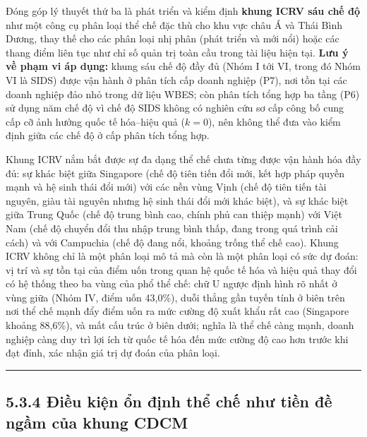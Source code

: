 \documentclass[
  a4paper,
  13pt]{extreport}
\begin{document}
Đóng góp lý thuyết thứ ba là phát triển và kiểm định \textbf{khung ICRV
sáu chế độ} như một công cụ phân loại thể chế đặc thù cho khu vực châu Á
và Thái Bình Dương, thay thế cho các phân loại nhị phân (phát triển và
mới nổi) hoặc các thang điểm liên tục như chỉ số quản trị toàn cầu trong
tài liệu hiện tại. \textbf{Lưu ý về phạm vi áp dụng:} khung sáu chế độ
đầy đủ (Nhóm I tới VI, trong đó Nhóm VI là SIDS) được vận hành ở phân
tích cấp doanh nghiệp (P7), nơi tồn tại các doanh nghiệp đảo nhỏ trong
dữ liệu WBES; còn phân tích tổng hợp ba tầng (P6) sử dụng năm chế độ vì
chế độ SIDS không có nghiên cứu sơ cấp công bố cung cấp cỡ ảnh hưởng
quốc tế hóa--hiệu quả (\(k = 0\)), nên không thể đưa vào kiểm định giữa
các chế độ ở cấp phân tích tổng hợp.

Khung ICRV nắm bắt được sự đa dạng thể chế chưa từng được vận hành hóa
đầy đủ: sự khác biệt giữa Singapore (chế độ tiên tiến đổi mới, kết hợp
pháp quyền mạnh và hệ sinh thái đổi mới) với các nền vùng Vịnh (chế độ
tiên tiến tài nguyên, giàu tài nguyên nhưng hệ sinh thái đổi mới khác
biệt), và sự khác biệt giữa Trung Quốc (chế độ trung bình cao, chính phủ
can thiệp mạnh) với Việt Nam (chế độ chuyển đổi thu nhập trung bình
thấp, đang trong quá trình cải cách) và với Campuchia (chế độ đang nổi,
khoảng trống thể chế cao). Khung ICRV không chỉ là một phân loại mô tả
mà còn là một phân loại có sức dự đoán: vị trí và sự tồn tại của điểm
uốn trong quan hệ quốc tế hóa và hiệu quả thay đổi có hệ thống theo ba
vùng của phổ thể chế: chữ U ngược định hình rõ nhất ở vùng giữa (Nhóm
IV, điểm uốn 43,0\%), duỗi thẳng gần tuyến tính ở biên trên nơi thể chế
mạnh đẩy điểm uốn ra mức cường độ xuất khẩu rất cao (Singapore khoảng
88,6\%), và mất cấu trúc ở biên dưới; nghĩa là thể chế càng mạnh, doanh
nghiệp càng duy trì lợi ích từ quốc tế hóa đến mức cường độ cao hơn
trước khi đạt đỉnh, xác nhận giá trị dự đoán của phân loại.

\begin{center}\rule{0.5\linewidth}{0.5pt}\end{center}

\hypertarget{ux111iux1ec1u-kiux1ec7n-ux1ed5n-ux111ux1ecbnh-thux1ec3-chux1ebf-nhux1b0-tiux1ec1n-ux111ux1ec1-ngux1ea7m-cux1ee7a-khung-cdcm}{%
\subsection{5.3.4 Điều kiện ổn định thể chế như tiền đề ngầm của khung
CDCM}\label{ux111iux1ec1u-kiux1ec7n-ux1ed5n-ux111ux1ecbnh-thux1ec3-chux1ebf-nhux1b0-tiux1ec1n-ux111ux1ec1-ngux1ea7m-cux1ee7a-khung-cdcm}}
\end{document}
